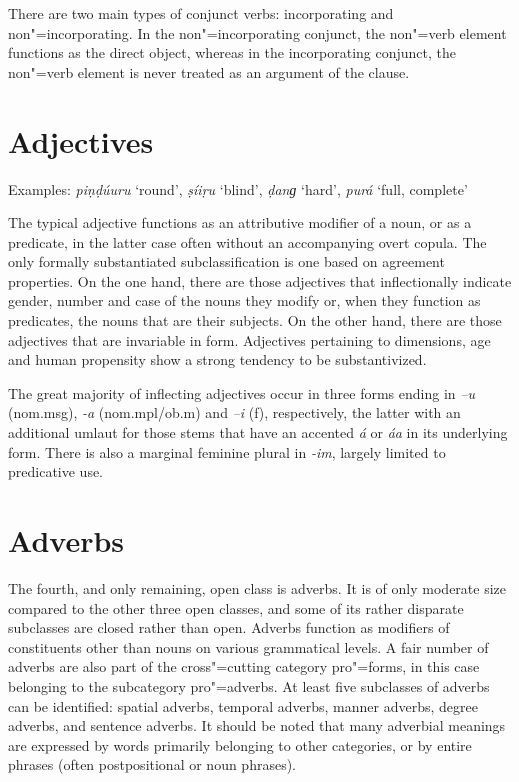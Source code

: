 There are two main types of conjunct verbs: incorporating and non"=incorporating. In the non"=incorporating conjunct, the non"=verb element functions as the direct object, whereas in the incorporating conjunct, the non"=verb element is never treated as an argument of the clause.


\section{Adjectives}
\label{sec:3b-4}
Examples: \textit{piṇḍúuru} `round', \textit{ṣíiṛu} `blind', \textit{ḍanɡ} `hard', \textit{purá} `full, complete'


The typical adjective functions as an attributive modifier of a noun, or as a predicate, in the latter case often without an accompanying overt copula. The only formally substantiated subclassification is one based on agreement properties. On the one hand, there are those adjectives that inflectionally indicate gender, number and case of the nouns they modify or, when they function as predicates, the nouns that are their subjects. On the other hand, there are those adjectives that are invariable in form. Adjectives pertaining to dimensions, age and human propensity show a strong tendency to be substantivized.


The great majority of inflecting adjectives occur in three forms ending in \textit{–u} (nom.msg),  \textit{-a} (nom.mpl/ob.m) and \textit{–i} (f), respectively, the latter with an additional umlaut for those stems that have an accented \textit{á} or \textit{áa} in its underlying form. There is also a marginal feminine plural in \textit{-im}, largely limited to predicative use.  


\section{Adverbs}
\label{sec:3b-5}
The fourth, and only remaining, open class is adverbs. It is of only moderate size compared to the other three open classes, and some of its rather disparate subclasses are closed rather than open. Adverbs function as modifiers of constituents other than nouns on various grammatical levels. A fair number of adverbs are also part of the cross"=cutting category pro"=forms, in this case belonging to the subcategory pro"=adverbs. At least five subclasses of adverbs can be identified: spatial adverbs, temporal adverbs, manner adverbs, degree adverbs, and sentence adverbs. It should be noted that many adverbial meanings are expressed by words primarily belonging to other categories, or by entire phrases (often postpositional or noun phrases).


